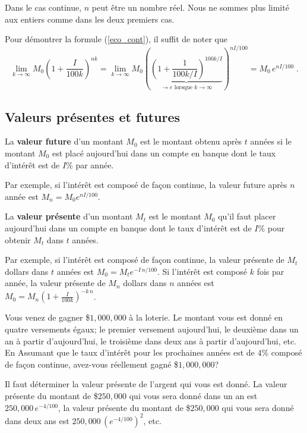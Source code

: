 {Dans le cas continue, $n$ peut être un nombre réel.  Nous ne sommes plus
limité aux entiers comme dans les deux premiers cas.

Pour démontrer la formule (\ref{eco_cont}), il suffit de noter que
\[
\lim_{k\rightarrow \infty} M_0\left(1+\frac{I}{100k}\right)^{nk}
= \lim_{k\rightarrow \infty} M_0\left(
\underbrace{\left(1+\frac{1}{100k/I}\right)^{100k/I}}_{\rightarrow e
\text{ lorsque } k \rightarrow \infty} \right)^{nI/100}
= M_0 \, e^{nI/100} \; .
\]

\subsection{Valeurs présentes et futures}

\begin{defn} 
La {\bfseries valeur future} d'un montant $M_0$
est le montant obtenu après $t$ années si le montant $M_0$ est placé
aujourd'hui dans un compte en banque dont le taux d'intérêt est de
$I$\% par année.
\end{defn}

Par exemple, si l'intérêt est composé de façon continue, la valeur
future après $n$ année est $M_n = M_0 e^{nI/100}$.

\begin{defn} 
La {\bfseries valeur présente} d'un montant
$M_t$ est le montant $M_0$ qu'il faut placer aujourd'hui dans un
compte en banque dont le taux d'intérêt est de $I$\% pour obtenir
$M_t$ dans $t$ années.
\end{defn}

Par exemple, si l'intérêt est composé de façon continue, la valeur
présente de $M_t$ dollars dans $t$ années est
$M_0 = M_t e^{-I\,n/100}$.  Si l'intérêt est composé $k$ fois par
année, la valeur présente de $M_n$ dollars dans $n$ 
années est
$\displaystyle M_0 = M_n \left(1 + \frac{I}{100k}\right)^{-k\,n}$.

\begin{egg}
Vous venez de gagner \$$1,000,000$ à la loterie.  Le montant vous est donné
en quatre versements égaux; le premier versement aujourd'hui, le deuxième
dans un an à partir d'aujourd'hui, le troisième dans deux ans à partir
d'aujourd'hui, etc.  En Assumant que le taux d'intérêt pour les
prochaines années est de $4$\% composé de façon continue,
avez-vous réellement gagné \$$1,000,000$?  

Il faut déterminer la valeur présente de l'argent qui vous est donné.  La
valeur présente du montant de \$$250,000$ qui vous sera donné dans un an est
$\displaystyle 250,000\,e^{-4/100}$, la valeur présente du montant de
\$$250,000$ qui vous sera donné dans deux ans est
$\displaystyle 250,000\,\left(e^{-4/100}\right)^2$, etc.


\end{egg}}
